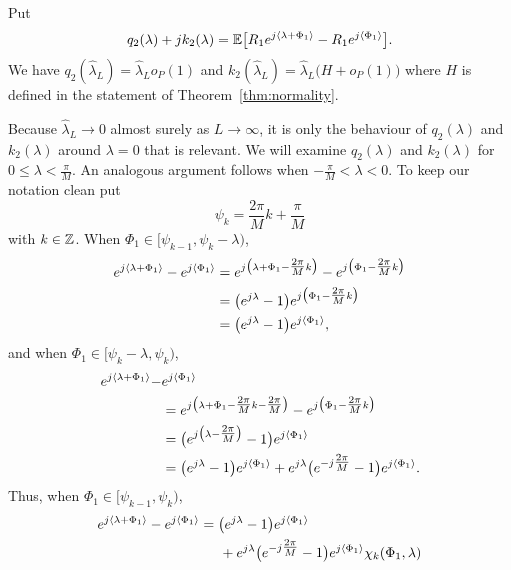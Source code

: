 \documentclass[journal]{IEEEtran}
\begin{document}
\begin{lemma}\label{lem:q2k2parts}
Put
\[
q_2(\lambda) + j k_2(\lambda) = {\mathbb E}\big[ R_1 e^{j\left\langle \lambda + \Phi_1 \right\rangle} - R_1 e^{j\left\langle \Phi_1 \right\rangle}  \big].
\]
We have $q_2(\hat{\lambda}_L) = \hat{\lambda}_L o_P(1)$ and $k_2(\hat{\lambda}_L) = \hat{\lambda}_L \big( H + o_P(1) \big)$ where $H$ is defined in the statement of Theorem~\ref{thm:normality}.
\end{lemma}
\begin{IEEEproof}
Because $\hat{\lambda}_L \rightarrow 0$ almost surely as $L\rightarrow\infty$, it is only the behaviour of $q_2(\lambda)$ and $k_2(\lambda)$ around $\lambda = 0$ that is relevant.  We will examine $q_2(\lambda)$ and $k_2(\lambda)$ for $0 \leq \lambda < \tfrac{\pi}{M}$.  An analogous argument follows when $-\tfrac{\pi}{M} < \lambda < 0$.  To keep our notation clean put 
\[
\psi_k = \frac{2\pi}{M}k + \frac{\pi}{M}
\] 
with $k \in {\mathbb Z}$.  When $\Phi_1 \in [\psi_{k-1}, \psi_k - \lambda)$,
\begin{align*}
e^{j\left\langle \lambda + \Phi_1 \right\rangle} - e^{j\left\langle \Phi_1 \right\rangle} &=  e^{j\big(\lambda + \Phi_1 - \tfrac{2\pi}{M}k\big)} - e^{j\big( \Phi_1- \tfrac{2\pi}{M}k\big)} \\
&= \big(e^{j\lambda} - 1 \big) e^{j\big(\Phi_1- \tfrac{2\pi}{M}k\big)} \\
&= \big(e^{j\lambda} - 1 \big) e^{j\left\langle \Phi_1 \right\rangle},
\end{align*}
and when $\Phi_1 \in [\psi_{k} - \lambda, \psi_k)$,
\begin{align*}
e^{j\left\langle \lambda + \Phi_1 \right\rangle} - &e^{j\left\langle \Phi_1 \right\rangle} \\
&=  e^{j\big(\lambda + \Phi_1 - \tfrac{2\pi}{M}k - \tfrac{2\pi}{M}\big)} - e^{j\big( \Phi_1- \tfrac{2\pi}{M}k\big)} \\
&= \big(e^{j\big(\lambda - \tfrac{2\pi}{M}\big)} - 1 \big) e^{j\left\langle \Phi_1 \right\rangle} \\
&= \big(e^{j\lambda} - 1 \big) e^{j\left\langle \Phi_1 \right\rangle}  + e^{j\lambda}\big( e^{-j\tfrac{2\pi}{M}} - 1 \big)e^{j\left\langle \Phi_1 \right\rangle}.
\end{align*}
Thus, when $\Phi_1 \in [\psi_{k-1}, \psi_k)$,
\begin{align*}
e^{j\left\langle \lambda + \Phi_1 \right\rangle} - e^{j\left\langle \Phi_1 \right\rangle} &= \big(e^{j\lambda} - 1 \big) e^{j\left\langle \Phi_1 \right\rangle} \\
&\hspace{0.5cm} + e^{j\lambda}\big( e^{-j\tfrac{2\pi}{M}} - 1 \big)e^{j\left\langle \Phi_1 \right\rangle} \chi_k(\Phi_1,\lambda)
\end{align*}

\end{IEEEproof}
\end{document}
